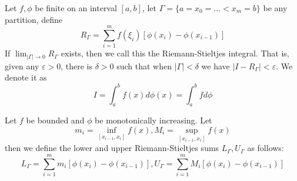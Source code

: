 \documentclass[openany]{book}
\begin{document}
\begin{defn}
    Let $f,\phi$ be finite on an interval $[a,b]$, let $\Gamma=\{a=x_0=\dots<x_m=b\}$ be any partition, define 
    \begin{equation*}
        R_\Gamma=\sum_{i=1}^mf(\xi_i)\left[\phi(x_i)-\phi(x_{i-1})\right]
    \end{equation*}
    If $\lim_{|\Gamma|\to0}R_\Gamma$ exists, then we call this the Riemann-Stieltjes integral. That is, given any $\varepsilon>0$, there is $\delta>0$ such that when $|\Gamma|<\delta$ we have $|I-R_\Gamma|<\varepsilon$. We denote it as 
    \begin{equation*}
        I=\int_a^bf(x)d\phi(x)=\int_a^b fd\phi
    \end{equation*}
\end{defn}
\begin{defn}
    Let $f$ be bounded and $\phi$ be monotonically increasing. Let 
    \begin{equation*}
        m_i=\inf_{[x_{i-1},x_i]}f(x), M_i=\sup_{[x_{i-1}, x_i]}f(x)
    \end{equation*}
    then we define the lower and upper Riemann-Stieltjes sums $L_\Gamma, U_\Gamma$ as follows:
    \begin{equation*}
        L_\Gamma=\sum_{i=1}^mm_i[\phi(x_i)-\phi(x_{i-1})], U_\Gamma=\sum_{i=1}^mM_i[\phi(x_i)-\phi(x_{i-1})]
    \end{equation*}
\end{defn}
\end{document}
